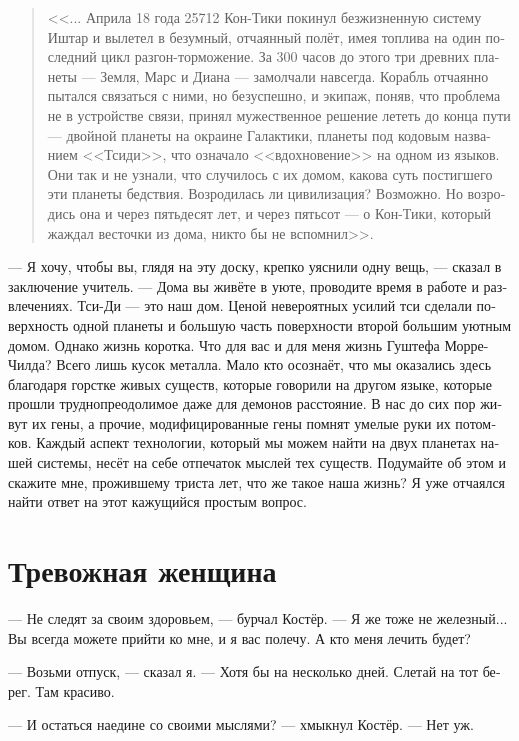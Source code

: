\documentclass[a4paper,12pt,fleqn]{book}\usepackage{polyglossia}\setdefaultlanguage[babelshorthands=true]{russian}\setotherlanguage{english}\defaultfontfeatures{Ligatures=TeX,Mapping=tex-text}\usepackage{xcolor}\newcommand{\ml}[3]{#2}
\begin{document}
{\begin{quote}
<<... Априла 18 года 25712 Кон-Тики покинул безжизненную систему Иштар и вылетел в безумный, отчаянный полёт, имея топлива на один последний цикл разгон-торможение.
За 300 часов до этого три древних планеты --- Земля, Марс и Диана --- замолчали навсегда.
Корабль отчаянно пытался связаться с ними, но безуспешно, и экипаж, поняв, что проблема не в устройстве связи, принял мужественное решение лететь до конца пути --- двойной планеты на окраине Галактики, планеты под кодовым названием <<Тсиди>>, что означало <<вдохновение>> на одном из языков.
Они так и не узнали, что случилось с их домом, какова суть постигшего эти планеты бедствия.
Возродилась ли цивилизация?
Возможно.
Но возродись она и через пятьдесят лет, и через пятьсот --- о Кон-Тики, который жаждал весточки из дома, никто бы не вспомнил>>.
\end{quote}

--- Я хочу, чтобы вы, глядя на эту доску, крепко уяснили одну вещь, --- сказал в заключение учитель.
--- Дома вы живёте в уюте, проводите время в работе и развлечениях.
Тси-Ди --- это наш дом.
Ценой невероятных усилий тси сделали поверхность одной планеты и большую часть поверхности второй большим уютным домом.
Однако жизнь коротка.
Что для вас и для меня жизнь Гуштефа Морре-Чилда?
Всего лишь кусок металла.
Мало кто осознаёт, что мы оказались здесь благодаря горстке живых существ, которые говорили на другом языке, которые прошли труднопреодолимое даже для демонов расстояние.
В нас до сих пор живут их гены, а прочие, модифицированные гены помнят умелые руки их потомков.
Каждый аспект технологии, который мы можем найти на двух планетах нашей системы, несёт на себе отпечаток мыслей тех существ.
Подумайте об этом и скажите мне, прожившему триста лет, что же такое наша жизнь?
Я уже отчаялся найти ответ на этот кажущийся простым вопрос.

\section{Тревожная женщина}

--- Не следят за своим здоровьем, --- бурчал Костёр.
--- Я же тоже не железный...
Вы всегда можете прийти ко мне, и я вас полечу.
А кто меня лечить будет?

--- Возьми отпуск, --- сказал я.
--- Хотя бы на несколько дней.
Слетай на тот берег.
Там красиво.

--- И остаться наедине со своими мыслями? --- хмыкнул Костёр.
--- Нет уж.

}
\end{document}
